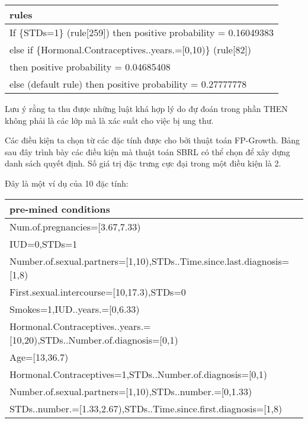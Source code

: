 \begin{table*}[hbt!]
\centering
\begin{tabular}{|l|}
\hline
\textbf{rules}                                                                                             \\ \hline
If \{STDs=1\} (rule{[}259{]}) then positive probability = 0.16049383                                       \\ \hline
else if \{Hormonal.Contraceptives..years.={[}0,10)\} (rule{[}82{]}) \\ then positive probability = 0.04685408 \\ \hline
else (default rule) then positive probability = 0.27777778                                                 \\ \hline
\end{tabular}
\end{table*}

Lưu ý rằng ta thu được những luật khá hợp lý do đự đoán trong phần THEN không phải là các lớp mà là xác suất cho việc bị ung thư.

Các điều kiện ta chọn từ các đặc tính được cho bởi thuật toán FP-Growth. Bảng sau đây trình bày các điều kiện mà thuật toán SBRL có thể chọn để xây dựng danh sách quyết định. Số giá trị đặc trưng cực đại trong một điều kiện là 2. 

\clearpage
Đây là một ví dụ của 10 đặc tính:

\begin{table*}[hbt!]
\centering
\begin{tabular}{|l|}
\hline
\textbf{pre-mined conditions}                                               \\ \hline
Num.of.pregnancies={[}3.67,7.33)                                            \\ \hline
IUD=0,STDs=1                                                                \\ \hline
Number.of.sexual.partners={[}1,10),STDs..Time.since.last.diagnosis={[}1,8)  \\ \hline
First.sexual.intercourse={[}10,17.3),STDs=0                                 \\ \hline
Smokes=1,IUD..years.={[}0,6.33)                                             \\ \hline
Hormonal.Contraceptives..years.={[}10,20),STDs..Number.of.diagnosis={[}0,1) \\ \hline
Age={[}13,36.7)                                                             \\ \hline
Hormonal.Contraceptives=1,STDs..Number.of.diagnosis={[}0,1)                 \\ \hline
Number.of.sexual.partners={[}1,10),STDs..number.={[}0,1.33)                 \\ \hline
STDs..number.={[}1.33,2.67),STDs..Time.since.first.diagnosis={[}1,8)        \\ \hline
\end{tabular}
\end{table*}

